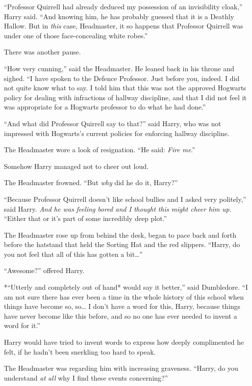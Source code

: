 ``Professor Quirrell had already deduced my possession of an
invisibility cloak,'' Harry said. ``And knowing him, he has probably
guessed that it is a Deathly Hallow. But in \emph{this} case,
Headmaster, it so happens that Professor Quirrell was under one of those
face-concealing white robes.''

There was another pause.

``How very cunning,'' said the Headmaster. He leaned back in his throne
and sighed. ``I have spoken to the Defence Professor. Just before you,
indeed. I did not quite know what to say. I told him that this was not
the approved Hogwarts policy for dealing with infractions of hallway
discipline, and that I did not feel it was appropriate for a Hogwarts
professor to do what he had done.''

``And what did Professor Quirrell say to that?'' said Harry, who was not
impressed with Hogwarts's current policies for enforcing hallway
discipline.

The Headmaster wore a look of resignation. ``He said: \emph{Fire me}.''

Somehow Harry managed not to cheer out loud.

The Headmaster frowned. ``But \emph{why} did he do it, Harry?''

``Because Professor Quirrell doesn't like school bullies and I asked
very politely,'' said Harry. \emph{And he was feeling bored and I
thought this might cheer him up.} ``Either that or it's part of some
incredibly deep plot.''

The Headmaster rose up from behind the desk, began to pace back and
forth before the hatstand that held the Sorting Hat and the red
slippers. ``Harry, do you not feel that all of this has gotten a
bit\ldots{}''

``Awesome?'' offered Harry.

*``Utterly and completely out of hand* would say it better,'' said
Dumbledore. ``I am not sure there has ever been a time in the whole
history of this school when things have become so, so\ldots{} I don't
have a word for this, Harry, because things have never become like this
before, and so no one has ever needed to invent a word for it.''

Harry would have tried to invent words to express how deeply
complimented he felt, if he hadn't been snerkling too hard to speak.

The Headmaster was regarding him with increasing graveness. ``Harry, do
you understand \emph{at all} why I find these events concerning?''

